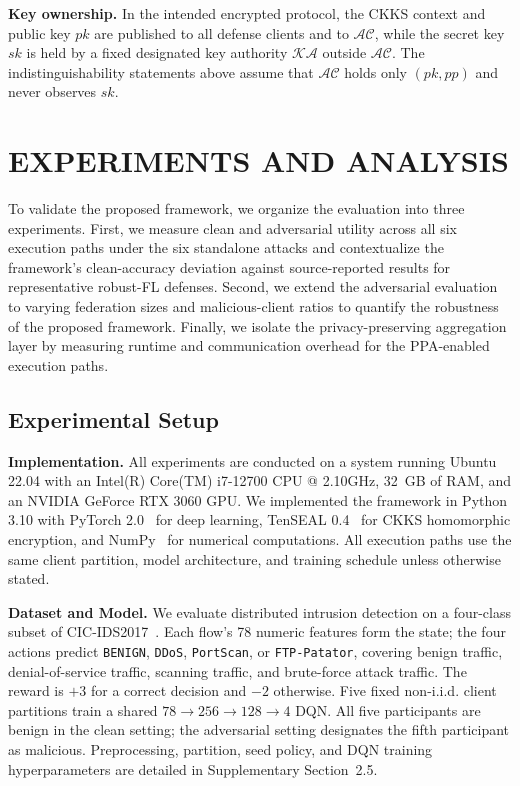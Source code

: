 \documentclass[journal]{IEEEtran}
\begin{document}
\noindent\textbf{Key ownership.}
In the intended encrypted protocol, the CKKS context and public key $pk$ are
published to all defense clients and to $\mathcal{AC}$, while the secret key
$sk$ is held by a fixed designated key authority $\mathcal{KA}$ outside
$\mathcal{AC}$. The indistinguishability statements above assume that
$\mathcal{AC}$ holds only $(pk,pp)$ and never observes $sk$.

\section{EXPERIMENTS AND ANALYSIS}\label{sec:experiments}
To validate the proposed framework, we organize the evaluation into three experiments.
First, we measure clean and adversarial utility across all six execution paths under 
the six standalone attacks and contextualize the framework's clean-accuracy deviation against
source-reported results for representative robust-FL defenses.
Second, we extend the adversarial evaluation to varying federation sizes and malicious-client
ratios to quantify the robustness of the proposed framework.
Finally, we isolate the privacy-preserving aggregation layer by measuring runtime and
communication overhead for the PPA-enabled execution paths.

\subsection{Experimental Setup}\label{sec:exp_setup}

\textbf{Implementation.}
All experiments are conducted on a system running Ubuntu 22.04 with an Intel(R)
Core(TM) i7-12700 CPU @ 2.10GHz, 32~GB of RAM, and an NVIDIA GeForce RTX 3060 GPU.
We implemented the framework in Python 3.10 with PyTorch 2.0~\cite{paszke2019pytorch} 
for deep learning, TenSEAL 0.4~\cite{benaissa2021tenseal} for CKKS homomorphic encryption,
and NumPy~\cite{harris2020numpy} for numerical computations.
All execution paths use the same client partition, model architecture, and
training schedule unless otherwise stated.

\textbf{Dataset and Model.}
We evaluate distributed intrusion detection on a four-class subset of
CIC-IDS2017~\cite{sharafaldin2018cicids2017,unb_cicids2017}. Each flow's 78
numeric features form the state; the four actions predict \texttt{BENIGN},
\texttt{DDoS}, \texttt{PortScan}, or \texttt{FTP-Patator}, covering benign traffic, 
denial-of-service traffic, scanning traffic, and brute-force attack traffic. The reward is
$+3$ for a correct decision and $-2$ otherwise. Five fixed non-i.i.d. client
partitions train a shared
$78\!\rightarrow\!256\!\rightarrow\!128\!\rightarrow\!4$ DQN. All five
participants are benign in the clean setting; the adversarial setting
designates the fifth participant as malicious. Preprocessing, partition, seed policy, 
and DQN training hyperparameters are detailed in Supplementary Section~2.5.
\end{document}
